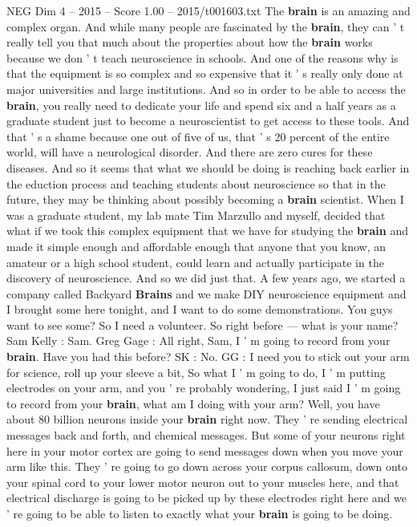\begin{textsample}{NEG Dim 4 – 2015 – Score 1.00 – 2015/t001603.txt}  \label{ex:f4_neg_032}
The \textbf{brain} is an amazing and complex organ.
And while many people are fascinated by the \textbf{brain}, they can ' t really tell you that much about the properties about how the \textbf{brain} works because we don ' t teach neuroscience in schools.
And one of the reasons why is that the equipment is so complex and so expensive that it ' s really only done at major universities and large institutions.
And so in order to be able to access the \textbf{brain}, you really need to dedicate your life and spend six and a half years as a graduate student just to become a neuroscientist to get access to these tools.
And that ' s a shame because one out of five of us, that ' s 20 percent of the entire world, will have a neurological disorder.
And there are zero cures for these diseases.
And so it seems that what we should be doing is reaching back earlier in the eduction process and teaching students about neuroscience so that in the future, they may be thinking about possibly becoming a \textbf{brain} scientist.
When I was a graduate student, my lab mate Tim Marzullo and myself, decided that what if we took this complex equipment that we have for studying the \textbf{brain} and made it simple enough and affordable enough that anyone that you know, an amateur or a high school student, could learn and actually participate in the discovery of neuroscience.
And so we did just that.
A few years ago, we started a company called Backyard \textbf{Brains} and we make DIY neuroscience equipment and I brought some here tonight, and I want to do some demonstrations.
You guys want to see some?
So I need a volunteer.
So right before — what is your name?
Sam Kelly : Sam.
Greg Gage : All right, Sam, I ' m going to record from your \textbf{brain}.
Have you had this before?
SK : No.
GG : I need you to stick out your arm for science, roll up your sleeve a bit, So what I ' m going to do, I ' m putting electrodes on your arm, and you ' re probably wondering, I just said I ' m going to record from your \textbf{brain}, what am I doing with your arm?
Well, you have about 80 billion neurons inside your \textbf{brain} right now.
They ' re sending electrical messages back and forth, and chemical messages.
But some of your neurons right here in your motor cortex are going to send messages down when you move your arm like this.
They ' re going to go down across your corpus callosum, down onto your spinal cord to your lower motor neuron out to your muscles here, and that electrical discharge is going to be picked up by these electrodes right here and we ' re going to be able to listen to exactly what your \textbf{brain} is going to be doing.

\end{textsample}
